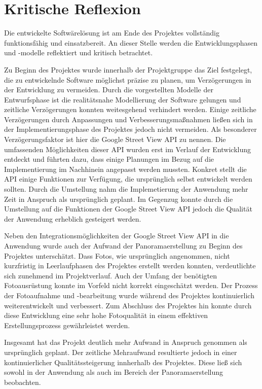 \section{Kritische Reflexion}
\label{sec:KritischeReflexion}

Die entwickelte Softwärelösung ist am Ende des Projektes vollständig
funktionsfähig und einsatzbereit. An dieser Stelle werden die Entwicklungsphasen
und -modelle reflektiert und kritisch betrachtet.

Zu Beginn des Projektes wurde innerhalb der Projektgruppe das Ziel festgelegt,
die zu entwickelnde Software möglichst präzise zu planen, um Verzögerungen in
der Entwicklung zu vermeiden. Durch die vorgestellten Modelle der Entwurfsphase
ist die realitätsnahe Modellierung der Software gelungen und zeitliche
Verzögerungen konnten weitesgehend verhindert werden. Einige zeitliche
Verzögerungen durch Anpassungen und Verbesserungsmaßnahmen ließen sich in der
Implementierungsphase des Projektes jedoch nicht vermeiden. Als besonderer
Verzögerungsfaktor ist hier die Google Street View API zu nennen. Die
umfassenden Möglichkeiten dieser API wurden erst im Verlauf der Entwicklung
entdeckt und führten dazu, dass einige Planungen im Bezug auf die
Implementierung im Nachhinein angepasst werden mussten. Konkret stellt die
API einige Funktionen zur Verfügung, die ursprünglich selbst entwickelt werden
sollten. Durch die Umstellung nahm die Implemetierung der Anwendung mehr Zeit in
Anspruch als ursprünglich geplant. Im Gegenzug konnte durch die Umstellung auf
die Funktionen der Google Street View API jedoch die Qualität der Anwendung
erheblich gesteigert werden.

Neben den Integrationsmöglichkeiten der Google Street View API in die Anwendung
wurde auch der Aufwand der Panoramaerstellung zu Beginn des
Projektes unterschätzt. Dass Fotos, wie ursprünglich angenommen, nicht
kurzfristig in Leerlaufphasen des Projektes erstellt werden konnten,
verdeutlichte sich zunehmend im Projektverlauf. Auch der Umfang der benötigten
Fotoausrüstung konnte im Vorfeld nicht korrekt eingeschätzt werden.
Der Prozess der Fotoaufnahme und -bearbeitung wurde während des Projektes
kontinuierlich weiterentwickelt und verbessert. Zum Abschluss des Projektes hin
konnte durch diese Entwicklung eine sehr hohe Fotoqualität in einem
effektiven Erstellungsprozess gewährleistet werden.

Insgesamt hat das Projekt deutlich mehr Aufwand in Anspruch genommen als
ursprünglich geplant. Der zeitliche Mehraufwand resultierte jedoch in einer
kontinuierlicher Qualitätssteigerung innherhalb des Projektes. Diese ließ
sich sowohl in der Anwendung als auch im Bereich der Panoramaerstellung
beobachten.
